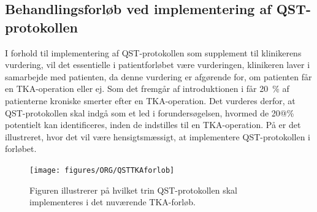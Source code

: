 
\subsection{Behandlingsforløb ved implementering af QST-protokollen}
I forhold til implementering af QST-protokollen som supplement til klinikerens vurdering, vil det essentielle i patientforløbet være vurderingen, klinikeren laver i samarbejde med patienten, da denne vurdering er afgørende for, om patienten får en TKA-operation eller ej. Som det fremgår af introduktionen i  får 20~\% af patienterne kroniske smerter efter en TKA-operation. Det vurderes derfor, at QST-protokollen skal indgå som et led i forundersøgelsen, hvormed de 20@\% potentielt kan identificeres, inden de indstilles til en TKA-operation. På  er det illustreret, hvor det vil være hensigtsmæssigt, at implementere QST-protokollen i forløbet. 

\begin{figure}[H]
\begin{center}
	\texttt{[image: figures/ORG/QSTTKAforlob]}
\end{center}
	\caption{Figuren illustrerer på hvilket trin QST-protokollen skal implementeres i det nuværende TKA-forløb.}
	\label{fig:QSTKAforlob}
\end{figure}\vspace{-.25cm}

